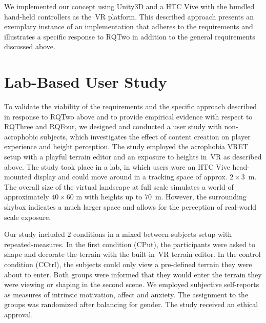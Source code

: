 We implemented our concept using Unity3D and a HTC Vive with the bundled hand-held controllers as the~\ac{VR} platform. This described approach presents an exemplary instance of an implementation that adheres to the requirements and illustrates a specific response to \acl{RQTwo} in addition to the general requirements discussed above.



\section{Lab-Based User Study}
\label{sec:user_study}

To validate the viability of the requirements and the specific approach described in response to \acl{RQTwo} above and to provide empirical evidence with respect to \acl{RQThree} and \acl{RQFour}, we designed and conducted a user study with non-acrophobic subjects, which investigates the effect of content creation on player experience and height perception.
The study employed the acrophobia \ac{VRET} setup with a playful terrain editor and an exposure to heights in~\ac{VR} as described above. 
The study took place in a lab, in which users wore an HTC Vive head-mounted display and could move around in a tracking space of approx. ${2{\times}3}$~\si{\metre}.
The overall size of the virtual landscape at full scale simulates a world of approximately ${40{\times}60}$ \si{\metre} with heights up to \SI{70}{\metre}. However, the surrounding skybox indicates a much larger space and allows for the perception of real-world scale exposure.

Our study included $2$ conditions in a mixed between-subjects setup with repeated-measures. In the first condition (\acl{CPut}), the participants were asked to shape and decorate the terrain with the built-in~\ac{VR} terrain editor.
In the control condition (\acl{CCtrl}), the subjects could only view a pre-defined terrain they were about to enter. Both groups were informed that they would enter the terrain they were viewing or shaping in the second scene. 
We employed subjective self-reports as measures of intrinsic motivation, affect and anxiety.
The assignment to the groups was randomized after balancing for gender.
The study received an ethical approval.

